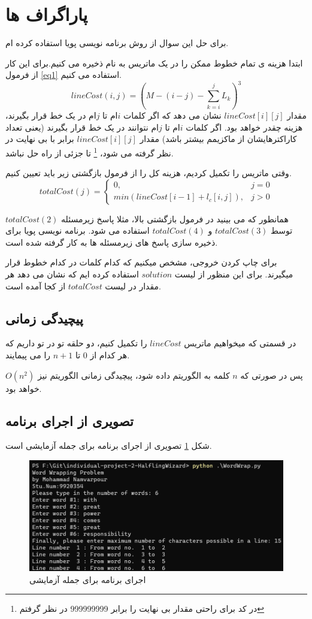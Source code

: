 \documentclass[12pt]{article}
\begin{document}
\section*{پاراگراف ها}

برای حل این سوال از روش برنامه نویسی پویا
استفاده کرده ام. 

ابتدا هزینه ی تمام خطوط ممکن را در یک ماتریس به نام
ذخیره می کنیم.برای این کار از فرمول 
\ref{eq1}
استفاده می کنیم.
\begin{equation}
lineCost(i,j)=(M-(i-j)-\sum_{k=i}^j L_k)^3
\label{eq1}
\end{equation}
 مقدار
$lineCost[i][j]$
نشان می دهد که اگر کلمات $i$ام تا $j$ام در یک خط قرار بگیرند، هزینه چقدر خواهد بود. اگر کلمات $i$ام تا $j$ام نتوانند در یک خط قرار بگیرند (یعنی تعداد کاراکترهایشان از ماکزیمم بیشتر باشد) مقدار
$lineCost[i][j]$
برابر با بی نهایت در نظر گرفته می شود،
\footnote{در کد برای راحتی مقدار بی نهایت را برابر 999999999 در نظر گرفتم}
تا جزئی از راه حل نباشد.

وقتی ماتریس 
را تکمیل کردیم، هزینه کل را از فرمول بازگشتی زیر باید تعیین کنیم.
\[
    totalCost(j)= 
\begin{cases}
    0,& j = 0\\
    min(lineCost[i-1]+l_c[i,j]),              & j>0
\end{cases}
\]

همانطور که می بینید در فرمول بازگشتی بالا، مثلا پاسخ زیرمسئله 
$totalCost(2)$
توسط 
$totalCost(3)$
و
$totalCost(4)$
استفاده می شود. برنامه نویسی پویا برای ذخیره سازی پاسخ های زیرمسئله ها به کار گرفته شده است.

برای چاپ کردن خروجی، مشخص میکنیم که کدام کلمات در کدام خطوط قرار میگیرند. برای این منظور از لیست 
$solution$
استفاده کرده ایم که نشان می دهد هر مقدار در لیست 
$totalCost$
از کجا آمده است. 

\subsection*{پیچیدگی زمانی}
در قسمتی که میخواهیم ماتریس 
$lineCost$
را تکمیل کنیم، دو حلقه تو در تو داریم که هر کدام از $0$ تا $n+1$ را می پیمایند.

پس در صورتی که $n$ کلمه به الگوریتم داده شود، پیچیدگی زمانی الگوریتم نیز 
$O(n^2)$
خواهد بود.

\subsection*{تصویری از اجرای برنامه}
شکل
\ref{fig1}
تصویری از اجرای برنامه برای جمله آزمایشی
است.

\begin{figure}[H]
	\centering
	\includegraphics[width=.4\linewidth]{run.png}
	\caption{اجرای برنامه برای جمله آزمایشی
}
	\label{fig1}
\end{figure}
\end{document}
